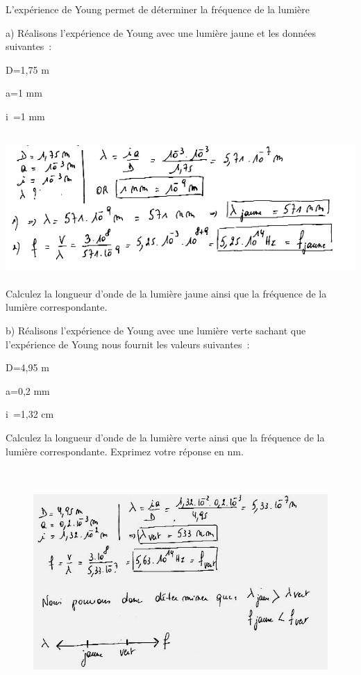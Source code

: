 L'expérience de Young permet de déterminer la fréquence de la lumière

a) Réalisons l'expérience de Young avec une lumière jaune et les données
suivantes~:

D=1,75 m

a=1 mm

i~=1 mm

\includegraphics[width=16.82cm,height=5.733cm]{Pictures/1000000100000243000000D01464CBCF0F7AAEC1.png}Calculez
la longueur d'onde de la lumière jaune ainsi que la fréquence de la
lumière correspondante.

b)\textbf{ }Réalisons l'expérience de Young avec une lumière verte
sachant que l'expérience de Young nous fournit les valeurs suivantes~:

D=4,95 m

a=0,2 mm

i~=1,32 cm

Calculez la longueur d'onde de la lumière verte ainsi que la fréquence
de la lumière correspondante. Exprimez votre réponse en nm.

\begin{figure}
\centering
\includegraphics[width=15.833cm,height=8.654cm]{Pictures/100000010000023700000151168D50BCCC321003.png}
\caption{}
\end{figure}

